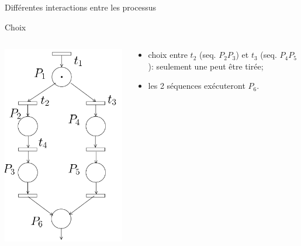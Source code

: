 \documentclass[compress]{beamer}
\begin{document}
\begin{frame}{Différentes interactions entre les processus}
\begin{block}{Choix}
\begin{columns}
	\begin{column}{.3\linewidth}
		\begin{center}
			\includegraphics[width=\linewidth]{alt}
		\end{center}
	\end{column}
	\begin{column}{.7\linewidth}
		\begin{itemize}
		\item choix entre $t_2$ (seq. $P_2P_3$) et $t_3$ (seq. $P_4P_5$): seulement une peut être tirée;
		\item les 2 séquences exécuteront $P_6$.
		\end{itemize} 
	\end{column}
\end{columns}
\end{block}
\end{frame}
\end{document}

